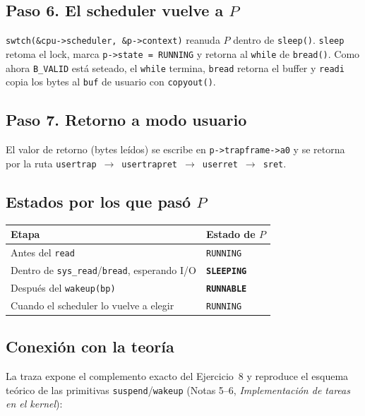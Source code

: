 \documentclass[11pt,a4paper]{article}
\begin{document}
\subsection*{Paso 6. El scheduler vuelve a $P$}

\texttt{swtch(\&cpu->scheduler, \&p->context)} reanuda $P$ dentro de
\texttt{sleep()}. \texttt{sleep} retoma el lock, marca
\texttt{p->state = RUNNING} y retorna al \texttt{while} de
\texttt{bread()}. Como ahora \texttt{B\_VALID} está seteado, el
\texttt{while} termina, \texttt{bread} retorna el buffer y \texttt{readi}
copia los bytes al \texttt{buf} de usuario con \texttt{copyout()}.

\subsection*{Paso 7. Retorno a modo usuario}

El valor de retorno (bytes leídos) se escribe en
\texttt{p->trapframe->a0} y se retorna por la ruta
\texttt{usertrap}~$\rightarrow$~\texttt{usertrapret}~$\rightarrow$~\texttt{userret}~$\rightarrow$~\texttt{sret}.

\subsection*{Estados por los que pasó $P$}

\begin{center}
\small
\begin{tabular}{@{}ll@{}}
\toprule
Etapa & Estado de $P$ \\
\midrule
Antes del \texttt{read}                          & \texttt{RUNNING} \\
Dentro de \texttt{sys\_read}/\texttt{bread}, esperando I/O & \textbf{\texttt{SLEEPING}} \\
Después del \texttt{wakeup(bp)}                  & \textbf{\texttt{RUNNABLE}} \\
Cuando el scheduler lo vuelve a elegir            & \texttt{RUNNING} \\
\bottomrule
\end{tabular}
\end{center}

\subsection*{Conexión con la teoría}

La traza expone el complemento exacto del Ejercicio~8 y reproduce el
esquema teórico de las primitivas \texttt{suspend}/\texttt{wakeup}
(Notas 5--6, \emph{Implementación de tareas en el kernel}):
\end{document}
